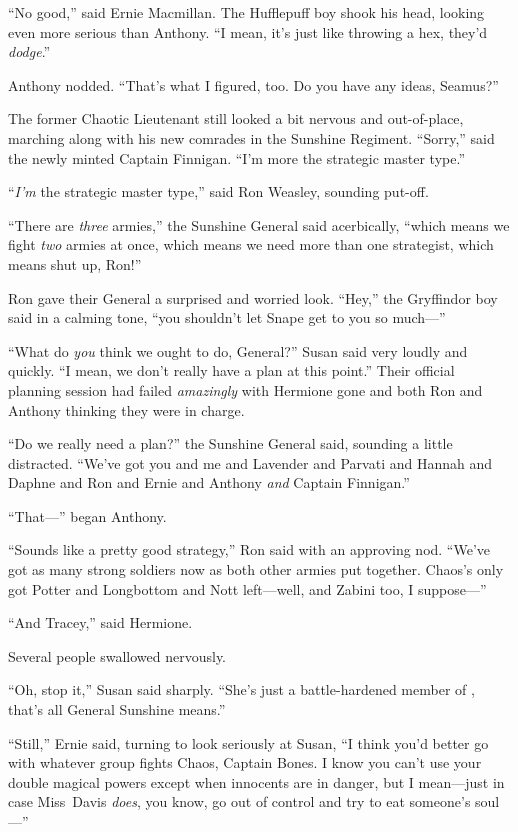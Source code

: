 “No good,” said Ernie Macmillan. The Hufflepuff boy shook his head, looking even more serious than Anthony. “I mean, it’s just like throwing a hex, they’d \emph{dodge}.”

Anthony nodded. “That’s what I figured, too. Do you have any ideas, Seamus?”

The former Chaotic Lieutenant still looked a bit nervous and out-of-place, marching along with his new comrades in the Sunshine Regiment. “Sorry,” said the newly minted Captain Finnigan. “I’m more the strategic master type.”

“\emph{I’m} the strategic master type,” said Ron Weasley, sounding put-off.

“There are \emph{three} armies,” the Sunshine General said acerbically, “which means we fight \emph{two} armies at once, which means we need more than one strategist, which means shut up, Ron!”

Ron gave their General a surprised and worried look. “Hey,” the Gryffindor boy said in a calming tone, “you shouldn’t let Snape get to you so much—”

“What do \emph{you} think we ought to do, General?” Susan said very loudly and quickly. “I mean, we don’t really have a plan at this point.” Their official planning session had failed \emph{amazingly} with Hermione gone and both Ron and Anthony thinking they were in charge.

“Do we really need a plan?” the Sunshine General said, sounding a little distracted. “We’ve got you and me and Lavender and Parvati and Hannah and Daphne and Ron and Ernie and Anthony \emph{and} Captain Finnigan.”

“That—” began Anthony.

“Sounds like a pretty good strategy,” Ron said with an approving nod. “We’ve got as many strong soldiers now as both other armies put together. Chaos’s only got Potter and Longbottom and Nott left—well, and Zabini too, I suppose—”

“And Tracey,” said Hermione.

Several people swallowed nervously.

“Oh, stop it,” Susan said sharply. “She’s just a battle-hardened member of \SPHEW, that’s all General Sunshine means.”

“Still,” Ernie said, turning to look seriously at Susan, “I think you’d better go with whatever group fights Chaos, Captain Bones. I know you can’t use your double magical powers except when innocents are in danger, but I mean—just in case Miss~Davis \emph{does}, you know, go out of control and try to eat someone’s soul—”

